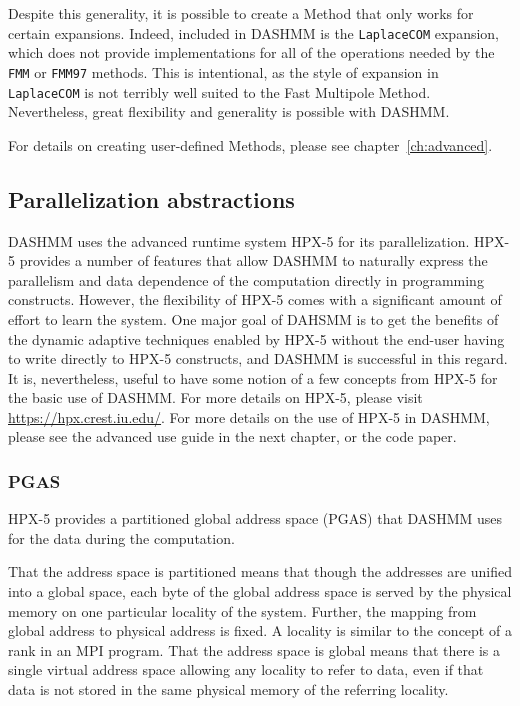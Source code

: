 Despite this generality, it is possible to create a Method that only
works for certain expansions. Indeed, included in DASHMM is the
\texttt{LaplaceCOM} expansion, which does not provide implementations for
all of the operations needed by the \texttt{FMM} or \texttt{FMM97}
methods. This is intentional, as the style of expansion in \texttt{LaplaceCOM}
is not terribly well suited to the Fast Multipole
Method. Nevertheless, great flexibility and generality is possible
with DASHMM.

For details on creating user-defined Methods, please see
chapter~\ref{ch:advanced}.

\subsection{Parallelization abstractions}

DASHMM uses the advanced runtime system HPX-5 for its
parallelization. HPX-5 provides a number of features that allow DASHMM
to naturally express the parallelism and data dependence of the
computation directly in programming constructs. However, the
flexibility of HPX-5 comes with a significant amount of effort to
learn the system. One major goal of DAHSMM is to get the benefits of
the dynamic adaptive techniques enabled by HPX-5 without the end-user
having to write directly to HPX-5 constructs, and DASHMM is successful
in this regard. It is, nevertheless, useful to have some notion of a
few concepts from HPX-5 for the basic use of DASHMM. For more details
on HPX-5, please visit \url{https://hpx.crest.iu.edu/}. For more
details on the use of HPX-5 in DASHMM, please see the advanced use
guide in the next chapter, or the code paper.

\subsubsection{PGAS}

HPX-5 provides a partitioned global address space (PGAS) that DASHMM uses for
the data during the computation.

That the address space is partitioned means that though the addresses are
unified into a global space, each byte of the global address space is served
by the physical memory on one particular locality of the system. Further,
the mapping from global address to physical address is fixed. A locality
is similar to the concept of a rank in an MPI program. That the address space
is global means that there is a single virtual address space allowing any
locality to refer to data, even if that data is not stored in the same physical
memory of the referring locality.

